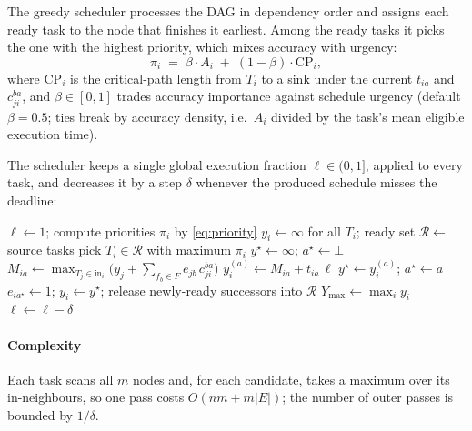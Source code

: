 \documentclass[conference]{IEEEtran}
\begin{document}
The greedy scheduler processes the DAG in dependency order and assigns each ready task to the node that finishes it earliest. Among the ready tasks it picks the one with the highest priority, which mixes accuracy with urgency:
\begin{equation}
\pi_i \;=\; \beta\cdot A_i \;+\; (1-\beta)\cdot \mathrm{CP}_i,
\label{eq:priority}
\end{equation}
where $\mathrm{CP}_i$ is the critical-path length from $T_i$ to a sink under the current $t_{ia}$ and $c_{ji}^{ba}$, and $\beta\in[0,1]$ trades accuracy importance against schedule urgency (default $\beta=0.5$; ties break by accuracy density, i.e.\ $A_i$ divided by the task's mean eligible execution time).

The scheduler keeps a single global execution fraction $\ell\in(0,1]$, applied to every task, and decreases it by a step $\delta$ whenever the produced schedule misses the deadline:

\begin{algorithm}[t]
\caption{Bandwidth/Data-Aware Greedy DAG Scheduler}
\label{alg:greedy}
\begin{algorithmic}[1]
\STATE $\ell\leftarrow 1$; compute priorities $\pi_i$ by \eqref{eq:priority}
\REPEAT
  \STATE $y_i\leftarrow\infty$ for all $T_i$; ready set $\mathcal{R}\leftarrow$ source tasks
    \STATE pick $T_i\in\mathcal{R}$ with maximum $\pi_i$
    \STATE $y^{\star}\leftarrow\infty$; $a^{\star}\leftarrow\bot$
        \STATE $M_{ia}\leftarrow \max_{T_j\in \mathrm{in}_i}\bigl(y_j+\sum_{f_b\in F} e_{jb}\, c_{ji}^{ba}\bigr)$
        \STATE $y_i^{(a)}\leftarrow M_{ia}+t_{ia}\,\ell$
            \STATE $y^{\star}\leftarrow y_i^{(a)}$; $a^{\star}\leftarrow a$
        \ENDIF
    \ENDFOR
    \STATE $e_{ia^{\star}}\leftarrow 1$; $y_i\leftarrow y^{\star}$; release newly-ready successors into $\mathcal{R}$
  \ENDWHILE
  \STATE $Y_{\max}\leftarrow \max_i y_i$
      \STATE $\ell\leftarrow\ell-\delta$ 
  \ENDIF
{}
\end{algorithmic}
\end{algorithm}

\paragraph*{Complexity} Each task scans all $m$ nodes and, for each candidate, takes a maximum over its in-neighbours, so one pass costs $O(nm+m|E|)$; the number of outer passes is bounded by $1/\delta$.
\end{document}
